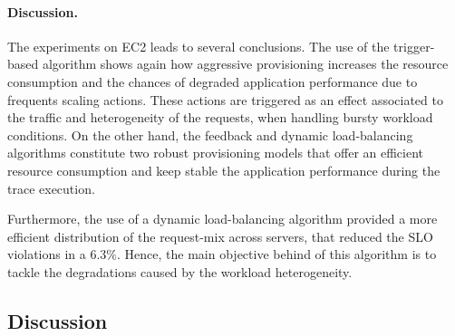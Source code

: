 \paragraph{Discussion.}
The experiments on EC2 leads to several conclusions. The use of the trigger-based algorithm shows again how aggressive provisioning increases the resource consumption and the chances of degraded application performance due to frequents scaling actions. These actions are triggered as an effect associated to the traffic and heterogeneity of the requests, when handling bursty workload conditions. On the other hand, the feedback and dynamic load-balancing algorithms constitute two robust provisioning models that offer an efficient resource consumption and keep stable the application performance during the trace execution. 

Furthermore, the use of a dynamic load-balancing algorithm provided a more efficient distribution of the request-mix across servers, that reduced the SLO violations in a 6.3\%. Hence, the main objective behind of this algorithm is to tackle the degradations caused by the workload heterogeneity.


	


\subsection*{Discussion}



